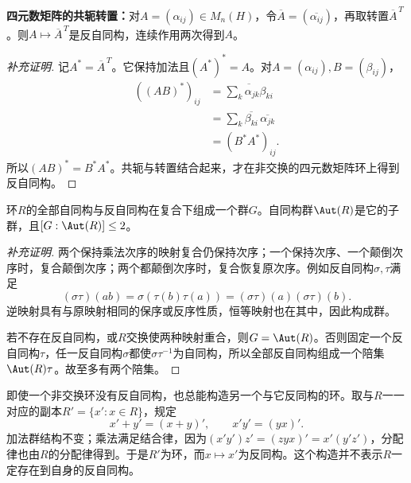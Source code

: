 \begin{example}
\textbf{四元数矩阵的共轭转置：}对$A=(\alpha_{ij})\in M_n(H)$，令$\overline A=(\overline{\alpha_{ij}})$，再取转置$\overline A^{\,T}$。则$A\mapsto\overline A^{\,T}$是反自同构，连续作用两次得到$A$。
\end{example}
\begin{proof}[补充证明]
记$A^*=\overline A^{\,T}$。它保持加法且$(A^*)^*=A$。对$A=(\alpha_{ij}),B=(\beta_{ij})$，
\begin{align*}
((AB)^*)_{ij}
&=\overline{\sum_k\alpha_{jk}\beta_{ki}}\\
&=\sum_k\overline{\beta_{ki}}\,\overline{\alpha_{jk}}\\
&=(B^*A^*)_{ij}.
\end{align*}
所以$(AB)^*=B^*A^*$。共轭与转置结合起来，才在非交换的四元数矩阵环上得到反自同构。
\end{proof}

\begin{proposition}
环$R$的全部自同构与反自同构在复合下组成一个群$G$。自同构群$\Aut(R)$是它的子群，且$[G:\Aut(R)]\leq2$。
\end{proposition}
\begin{proof}[补充证明]
两个保持乘法次序的映射复合仍保持次序；一个保持次序、一个颠倒次序时，复合颠倒次序；两个都颠倒次序时，复合恢复原次序。例如反自同构$\sigma,\tau$满足
\[
(\sigma\tau)(ab)=\sigma(\tau(b)\tau(a))
=(\sigma\tau)(a)(\sigma\tau)(b).
\]
逆映射具有与原映射相同的保序或反序性质，恒等映射也在其中，因此构成群。

若不存在反自同构，或$R$交换使两种映射重合，则$G=\Aut(R)$。否则固定一个反自同构$\tau$，任一反自同构$\sigma$都使$\sigma\tau^{-1}$为自同构，所以全部反自同构组成一个陪集$\Aut(R)\tau$。故至多有两个陪集。
\end{proof}

即使一个非交换环没有反自同构，也总能构造另一个与它反同构的环。取与$R$一一对应的副本$R'=\{x':x\in R\}$，规定
\[
x'+y'=(x+y)',\qquad x'y'=(yx)'.
\]
加法群结构不变；乘法满足结合律，因为$(x'y')z'=(zyx)'=x'(y'z')$，分配律也由$R$的分配律得到。于是$R'$为环，而$x\mapsto x'$为反同构。这个构造并不表示$R$一定存在到自身的反自同构。
